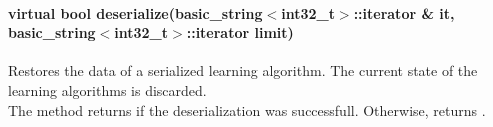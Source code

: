 \paragraph{virtual bool deserialize(basic\_string$<$int32\_t$>$::iterator \& it, basic\_string$<$int32\_t$>$::iterator limit)}
Restores the data of a serialized learning algorithm. The current state of the learning algorithms is discarded. \\
The method returns \true if the deserialization was successfull. Otherwise, returns \false.
